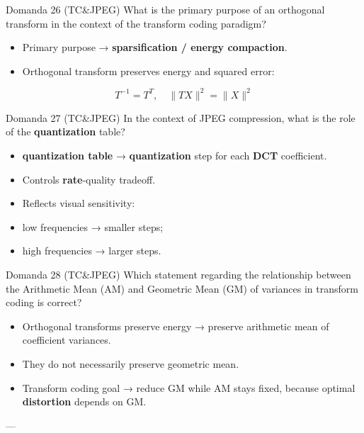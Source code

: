\begin{questionbox}{Domanda 26}
(TC\&JPEG) What is the primary purpose of an orthogonal transform in the context of the transform coding paradigm?
\end{questionbox}


\begin{itemize}
  \item Primary purpose → \textbf{sparsification / energy compaction}.
  \item Orthogonal transform preserves energy and squared error:
\end{itemize}


$$
T^{-1}=T^T,\quad \|TX\|^2=\|X\|^2
$$




\begin{questionbox}{Domanda 27}
(TC\&JPEG) In the context of JPEG compression, what is the role of the \textbf{quantization} table?
\end{questionbox}


\begin{itemize}
  \item \textbf{\textbf{quantization} table} → \textbf{quantization} step for each \textbf{DCT} coefficient.
  \item Controls \textbf{rate}-quality tradeoff.
  \item Reflects visual sensitivity:
  \item low frequencies → smaller steps;
  \item high frequencies → larger steps.
\end{itemize}



\begin{questionbox}{Domanda 28}
(TC\&JPEG) Which statement regarding the relationship between the Arithmetic Mean (AM) and Geometric Mean (GM) of variances in transform coding is correct?
\end{questionbox}


\begin{itemize}
  \item Orthogonal transforms preserve energy → preserve arithmetic mean of coefficient variances.
  \item They do not necessarily preserve geometric mean.
  \item Transform coding goal → reduce GM while AM stays fixed, because optimal \textbf{distortion} depends on GM.
\end{itemize}

---


